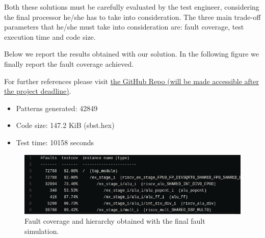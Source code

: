 \documentclass{article}
\begin{document}
Both these solutions must be carefully evaluated by the test engineer, considering the final processor he/she has to take into consideration. The three main trade-off parameters that he/she must take into consideration are: fault coverage, test execution time and code size.

Below we report the results obtained with our solution. In the following figure we finally report the fault coverage achieved.

For further references please visit \href{https://github.com/Mrcuve0/TFT-RI5CY-Assignment}{the GitHub Repo (will be made accessible after the project deadline)}.

\begin{itemize}
    \item Patterns generated: 42849
    \item Code size: 147.2 KiB (sbst.hex)
    \item Test time: 10158 seconds
\end{itemize}

\begin{figure}[]
    \centering
    \includegraphics[width=0.6\columnwidth]{./screenshots/faultHierarchy.png}
    \caption{Fault coverage and hierarchy obtained with the final fault simulation.}
    \label{fig:faultHierarchy}
\end{figure}
\end{document}
